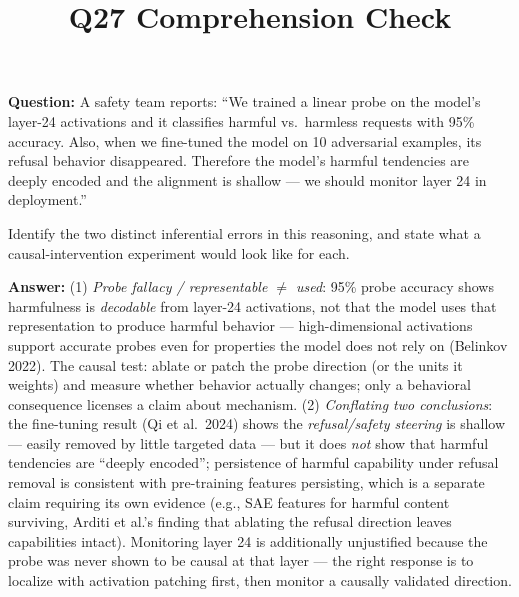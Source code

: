 \documentclass[11pt]{article}
\title{Q27 Comprehension Check}
\date{}
\begin{document}
\maketitle
\textbf{Question:} A safety team reports: ``We trained a linear probe on the model's layer-24 activations and it classifies harmful vs.\ harmless requests with 95\% accuracy. Also, when we fine-tuned the model on 10 adversarial examples, its refusal behavior disappeared. Therefore the model's harmful tendencies are deeply encoded and the alignment is shallow --- we should monitor layer 24 in deployment.''

Identify the two distinct inferential errors in this reasoning, and state what a causal-intervention experiment would look like for each.

\vspace{1em}
\textbf{Answer:} (1) \emph{Probe fallacy / representable $\neq$ used}: 95\% probe accuracy shows harmfulness is \emph{decodable} from layer-24 activations, not that the model uses that representation to produce harmful behavior --- high-dimensional activations support accurate probes even for properties the model does not rely on (Belinkov 2022). The causal test: ablate or patch the probe direction (or the units it weights) and measure whether behavior actually changes; only a behavioral consequence licenses a claim about mechanism. (2) \emph{Conflating two conclusions}: the fine-tuning result (Qi et al.\ 2024) shows the \emph{refusal/safety steering} is shallow --- easily removed by little targeted data --- but it does \emph{not} show that harmful tendencies are ``deeply encoded''; persistence of harmful capability under refusal removal is consistent with pre-training features persisting, which is a separate claim requiring its own evidence (e.g., SAE features for harmful content surviving, Arditi et al.'s finding that ablating the refusal direction leaves capabilities intact). Monitoring layer 24 is additionally unjustified because the probe was never shown to be causal at that layer --- the right response is to localize with activation patching first, then monitor a causally validated direction.
\end{document}
